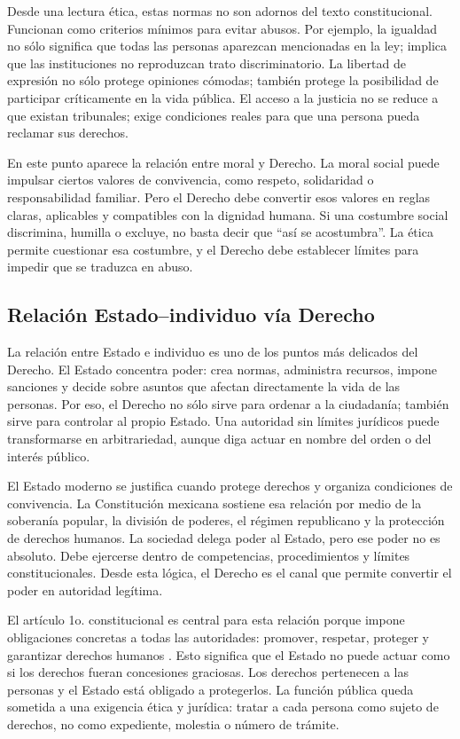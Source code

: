 \documentclass[
	spanish,
	letterpaper, oneside
]{article}
\begin{document}
Desde una lectura ética, estas normas no son adornos del texto constitucional. Funcionan como criterios mínimos para evitar abusos. Por ejemplo, la igualdad no sólo significa que todas las personas aparezcan mencionadas en la ley; implica que las instituciones no reproduzcan trato discriminatorio. La libertad de expresión no sólo protege opiniones cómodas; también protege la posibilidad de participar críticamente en la vida pública. El acceso a la justicia no se reduce a que existan tribunales; exige condiciones reales para que una persona pueda reclamar sus derechos.

En este punto aparece la relación entre moral y Derecho. La moral social puede impulsar ciertos valores de convivencia, como respeto, solidaridad o responsabilidad familiar. Pero el Derecho debe convertir esos valores en reglas claras, aplicables y compatibles con la dignidad humana. Si una costumbre social discrimina, humilla o excluye, no basta decir que ``así se acostumbra''. La ética permite cuestionar esa costumbre, y el Derecho debe establecer límites para impedir que se traduzca en abuso.

\subsection{Relación Estado--individuo vía Derecho}

La relación entre Estado e individuo es uno de los puntos más delicados del Derecho. El Estado concentra poder: crea normas, administra recursos, impone sanciones y decide sobre asuntos que afectan directamente la vida de las personas. Por eso, el Derecho no sólo sirve para ordenar a la ciudadanía; también sirve para controlar al propio Estado. Una autoridad sin límites jurídicos puede transformarse en arbitrariedad, aunque diga actuar en nombre del orden o del interés público.

El Estado moderno se justifica cuando protege derechos y organiza condiciones de convivencia. La Constitución mexicana sostiene esa relación por medio de la soberanía popular, la división de poderes, el régimen republicano y la protección de derechos humanos. La sociedad delega poder al Estado, pero ese poder no es absoluto. Debe ejercerse dentro de competencias, procedimientos y límites constitucionales. Desde esta lógica, el Derecho es el canal que permite convertir el poder en autoridad legítima.

El artículo 1o. constitucional es central para esta relación porque impone obligaciones concretas a todas las autoridades: promover, respetar, proteger y garantizar derechos humanos \citep{constitucionCPEUM2026}. Esto significa que el Estado no puede actuar como si los derechos fueran concesiones graciosas. Los derechos pertenecen a las personas y el Estado está obligado a protegerlos. La función pública queda sometida a una exigencia ética y jurídica: tratar a cada persona como sujeto de derechos, no como expediente, molestia o número de trámite.
\end{document}

